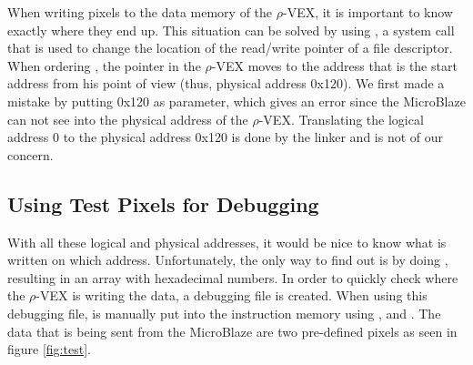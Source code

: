 When writing pixels to the data memory of the $\rho$-VEX, it is important to know exactly where they end up. This situation can be solved by using , a system call that is used to change the location of the read/write pointer of a file descriptor. When ordering , the pointer in the $\rho$-VEX moves to the address that is the start address from his point of view (thus, physical address 0x120). We first made a mistake by putting 0x120 as  parameter, which gives an error since the MicroBlaze can not see into the physical address of the $\rho$-VEX. Translating the logical address 0 to the physical address 0x120 is done by the linker and is not of our concern.


\subsection{Using Test Pixels for Debugging}

With all these logical and physical addresses, it would be nice to know what is written on which address. Unfortunately, the only way to find out is by doing , resulting in an array with hexadecimal numbers. In order to quickly check where the $\rho$-VEX is writing the data, a debugging file  is created. When using this debugging file,  is manually put into the instruction memory using ,  and . The data that is being sent from the MicroBlaze are two pre-defined pixels as seen in figure \ref{fig:test}.
